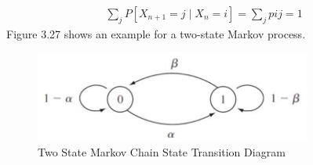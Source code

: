 \documentclass[12pt,twoside,a4]{mwbk}
\begin{document}
\begin{subequations}
\begin{align}
        \sum_{j} P\left[X_{n+1}=j \mid X_{n}=i\right]=\sum_{j} p i j=1
\end{align}
\end{subequations}
\newpage
\noindent Figure 3.27 shows an example for a two-state Markov process.
\begin{figure}[h]
    \centering
    \includegraphics[width=7.9 cm, height=3.0cm]{markov.jpg}
    \caption{Two State Markov Chain State Transition Diagram }
\end{figure}
\end{document}
